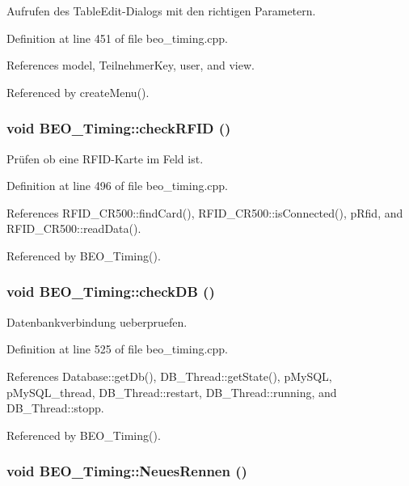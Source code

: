 Aufrufen des TableEdit-Dialogs mit den richtigen Parametern. 



Definition at line 451 of file beo\_\-timing.cpp.

References model, TeilnehmerKey, user, and view.

Referenced by createMenu().\hypertarget{class_b_e_o___timing_b3d37415fce4b586bca4397bd790105c}{
\subsubsection[checkRFID]{\setlength{\rightskip}{0pt plus 5cm}void BEO\_\-Timing::checkRFID ()}}
\label{class_b_e_o___timing_b3d37415fce4b586bca4397bd790105c}


Prüfen ob eine RFID-Karte im Feld ist. 



Definition at line 496 of file beo\_\-timing.cpp.

References RFID\_\-CR500::findCard(), RFID\_\-CR500::isConnected(), pRfid, and RFID\_\-CR500::readData().

Referenced by BEO\_\-Timing().\hypertarget{class_b_e_o___timing_6695ca0572c0a4484d2926c16a3f477b}{
\subsubsection[checkDB]{\setlength{\rightskip}{0pt plus 5cm}void BEO\_\-Timing::checkDB ()}}
\label{class_b_e_o___timing_6695ca0572c0a4484d2926c16a3f477b}


Datenbankverbindung ueberpruefen. 



Definition at line 525 of file beo\_\-timing.cpp.

References Database::getDb(), DB\_\-Thread::getState(), pMySQL, pMySQL\_\-thread, DB\_\-Thread::restart, DB\_\-Thread::running, and DB\_\-Thread::stopp.

Referenced by BEO\_\-Timing().\hypertarget{class_b_e_o___timing_6836bffd46ffdbf81149f4e245435731}{
\subsubsection[NeuesRennen]{\setlength{\rightskip}{0pt plus 5cm}void BEO\_\-Timing::NeuesRennen ()}}
\label{class_b_e_o___timing_6836bffd46ffdbf81149f4e245435731}


